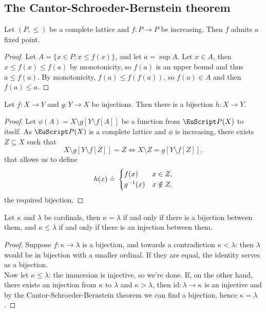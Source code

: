 \documentclass[twoside,openright,titlepage,numbers=noenddot,%
               headinclude,footinclude,cleardoublepage=empty,abstract=on,
               BCOR=23mm,paper=letter,fontsize=11pt
               ]{scrreprt}
\begin{document}
\subsection{The Cantor-Schroeder-Bernstein theorem}
\begin{proposition}
    Let $(P, \leq)$ be a complete lattice and $f: P \to P$ be increasing. Then $f$ admits a fixed point.
\end{proposition}
\begin{proof}
    Let $A = \{x \in P: x \leq f(x)\}$, and let $a = \sup A$. Let $x \in A$, then $x \leq f(x) \leq f(a)$ by monotonicity, so $f(a)$ is an upper bound and thus $a \leq f(a)$. By monotonicity, $f(a) \leq f(f(a))$, so $f(a) \in A$ and then $f(a) \leq a$.
\end{proof}
\begin{theorem}
    Let $f: X \to Y$ and $g: Y \to X$ be injections. Then there is a bijection $h: X \to Y$.
\end{theorem}
\begin{proof}
    Let $\phi(A) = X \setminus g[Y \setminus f[A]]$ be a function from $\P(X)$ to itself. As $\P(X)$ is a complete lattice and $\phi$ is increasing, there exists $Z \subseteq X$ such that
    \[ X \setminus g[Y \setminus f[Z]] = Z \iff X \setminus Z = g[Y \setminus f[Z]], \]
    that allows us to define
    \begin{equation*}
    h(x) \hskip1mm\dot{=}\hskip1mm
     \begin{cases}
        f(x) & x \in Z, \\
        g^{-1}(x) & x \notin Z,
    \end{cases}
    \end{equation*}
    the required bijection.
\end{proof}
\begin{proposition}
    \label{prop:cardinaliuguali}
    Let $\kappa$ and $\lambda$ be cardinals, then $\kappa = \lambda$ if and only if there is a bijection between them, and $\kappa \leq \lambda$ if and only if there is an injection between them.
\end{proposition}
\begin{proof}
    Suppose $f: \kappa \to \lambda$ is a bijection, and towards a contradiction $\kappa < \lambda$: then $\lambda$ would be in bijection with a smaller ordinal. If they are equal, the identity serves as a bijection. \\
    Now let $\kappa \leq \lambda$: the immersion is injective, so we're done. If, on the other hand, there exists an injection from $\kappa$ to $\lambda$ and $\kappa > \lambda$, then $\mathrm{id}: \lambda \to \kappa$ is an injective and by the Cantor-Schroeder-Bernstein theorem we can find a bijection, hence $\kappa = \lambda$.
\end{proof}
\end{document}
